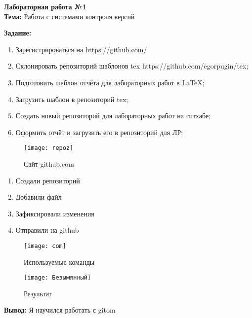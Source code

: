 \begin{center}
\textbf{Лабораторная работа №1}
\\
\textbf{Тема:} Работа с системами контроля версий
\\
\end{center}
\textbf{Задание:} 
\begin{enumerate}
\item Зарегистрироваться на https://github.com/
\item Склонировать репозиторий шаблонов tex https://github.com/egorpugin/tex;
\item Подготовить шаблон отчёта для лабораторных работ в LaTeX;
\item Загрузить шаблон в репозиторий tex;
\item Создать новый репозиторий для лабораторных работ на гитхабе;
\item Оформить отчёт и загрузить его в репозиторий для ЛР;
\\
\end{enumerate}
\begin{figure}[h]
\centering
\texttt{[image: repoz]}
\caption{Сайт github.com}
\label{fig:repoz}
\end{figure}

\newpage
\begin{enumerate}
\item Создали репозиторий
\item Добавили файл
\item Зафиксировали изменения
\item Отправили на github

\end{enumerate}

\begin{figure}[h]
\centering
\texttt{[image: com]}
\caption{Используемые команды}
\label{fig:com}
\end{figure}

\newpage

\begin{figure}[h]
\centering
\texttt{[image: Безымянный]}
\caption{Результат}
\label{fig:Безымянный}
\end{figure}



\textbf{Вывод:} Я научился работать с gitom



